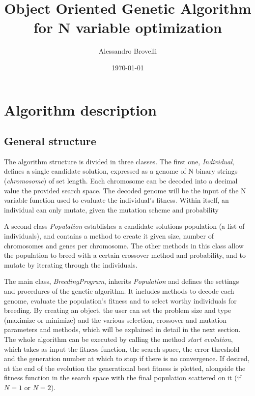\documentclass[twocolumn]{article}
\title{Object Oriented Genetic Algorithm for N variable optimization}
\author{Alessandro Brovelli}
\date{\today}
\begin{document}

\section{Algorithm description}
\subsection{General structure}
The algorithm structure is divided in three classes. The first one, \textit{Individual}, defines a single candidate solution, expressed as a genome of N binary strings (\textit{chromosome}) of set length. Each chromosome can be decoded into a decimal value  the provided search space. The decoded genome will be the input of the N variable function used to evaluate the individual's fitness. Within itself, an individual can only mutate, given the mutation scheme and probability

A second class \textit{Population} establishes a candidate solutions population (a list of individuals), and contains a method to create it given size, number of chromosomes and genes per chromosome. The other methods in this class allow the population to breed with a certain crossover method and probability, and to mutate by iterating through the individuals.

The main class, \textit{BreedingProgram}, inherits \textit{Population} and defines the settings and procedures of the genetic algorithm. It includes methods to decode each genome, evaluate the population's fitness and to select worthy individuals for breeding. By creating an object, the user can set the problem size and type (maximize or minimize) and the various selection, crossover and mutation parameters and methods, which will be explained in detail in the next section. The whole algorithm can be executed by calling the method \textit{start evolution}, which takes as input the fitness function, the search space, the error threshold and the generation number at which to stop if there is no convergence. If desired, at the end of the evolution the generational best fitness is plotted, alongside the fitness function in the search space with the final population scattered on it (if $N = 1$ or $N = 2$).
\end{document}
